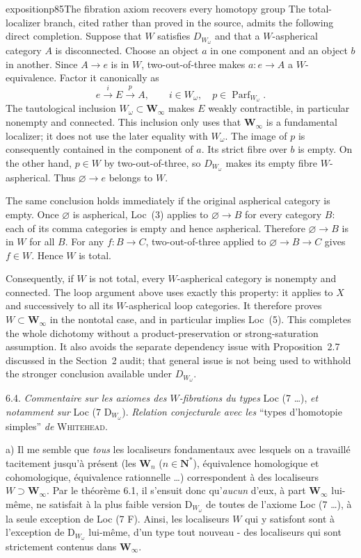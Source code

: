 \begin{dcomment}{exposition}{p85}{The fibration axiom recovers every homotopy group}
The total-localizer branch, cited rather than proved in the source, admits the following direct completion. Suppose that $W$ satisfies $D_{W_\omega}$ and that a $W$-aspherical category $A$ is disconnected. Choose an object $a$ in one component and an object $b$ in another. Since $A\to e$ is in $W$, two-out-of-three makes $a:e\to A$ a $W$-equivalence. Factor it canonically as
\[
 e\xrightarrow{i}E\xrightarrow{p}A,
 \qquad i\in W_\omega,\quad p\in\operatorname{Parf}_{W_\omega}.
\]
The tautological inclusion $W_\omega\subset\mathbf W_\infty$ makes $E$ weakly contractible, in particular nonempty and connected. This inclusion only uses that $\mathbf W_\infty$ is a fundamental localizer; it does not use the later equality with $W_\omega$. The image of $p$ is consequently contained in the component of $a$. Its strict fibre over $b$ is empty. On the other hand, $p\in W$ by two-out-of-three, so $D_{W_\omega}$ makes its empty fibre $W$-aspherical. Thus $\varnothing\to e$ belongs to $W$.

The same conclusion holds immediately if the original aspherical category is empty. Once $\varnothing$ is aspherical, Loc~(3) applies to $\varnothing\to B$ for every category $B$: each of its comma categories is empty and hence aspherical. Therefore $\varnothing\to B$ is in $W$ for all $B$. For any $f:B\to C$, two-out-of-three applied to $\varnothing\to B\to C$ gives $f\in W$. Hence $W$ is total.

Consequently, if $W$ is not total, every $W$-aspherical category is nonempty and connected. The loop argument above uses exactly this property: it applies to $X$ and successively to all its $W$-aspherical loop categories. It therefore proves $W\subset\mathbf W_\infty$ in the nontotal case, and in particular implies Loc~(5). This completes the whole dichotomy without a product-preservation or strong-saturation assumption. It also avoids the separate dependency issue with Proposition~2.7 discussed in the Section~2 audit; that general issue is not being used to withhold the stronger conclusion available under $D_{W_\omega}$.
\end{dcomment}


6.4. \textit{Commentaire sur les axiomes des $W$-fibrations du types} Loc (7 \ldots), \textit{et notamment sur} Loc (7 D$_{W_\omega}$). \textit{Relation conjecturale avec les} “types d'homotopie simples” \textit{de} \textsc{Whitehead}. %

a) Il me semble que \textit{tous} les localiseurs fondamentaux avec lesquels on a travaillé tacitement jusqu'à présent (les $\mathbf{W}_n$ ($n \in \mathbf{N}^*$), équivalence homologique et cohomologique, équivalence rationnelle \ldots) correspondent à des localiseurs $W \supset \mathbf{W}_\infty$. Par le théorème 6.1, il s'ensuit donc qu'\textit{aucun} d'eux, à part $\mathbf{W}_\infty$ lui-même, ne satisfait à la plus faible version D$_{W_\omega}$ de toutes de l'axiome Loc (7 \ldots), à la seule exception de Loc (7 F). Ainsi, les localiseurs $W$ qui y satisfont sont à l'exception de D$_{W_\omega}$ lui-même, d'un type tout nouveau - des localiseurs qui sont strictement contenus dans $\mathbf{W}_\infty$.

